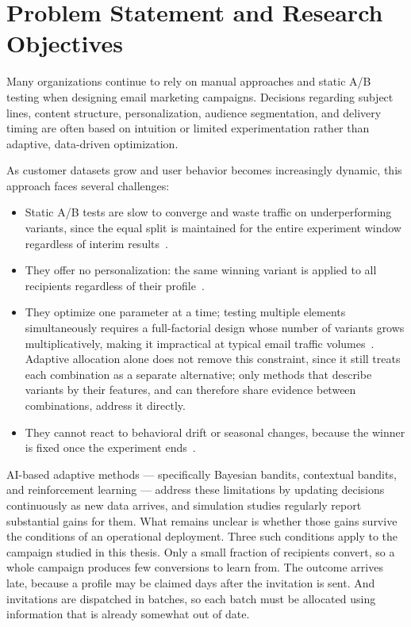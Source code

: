 \chapter{Problem Statement and Research Objectives}
\label{chap:problem_statement}

Many organizations continue to rely on manual approaches and static A/B testing when designing email marketing campaigns. Decisions regarding subject lines, content structure, personalization, audience segmentation, and delivery timing are often based on intuition or limited experimentation rather than adaptive, data-driven optimization.

As customer datasets grow and user behavior becomes increasingly dynamic, this approach faces several challenges:

\begin{itemize}
    \item Static A/B tests are slow to converge and waste traffic on underperforming variants, since the equal split is maintained for the entire experiment window regardless of interim results~\cite{schwartz2017customer, kohavi2009controlled}.
    \item They offer no personalization: the same winning variant is applied to all recipients regardless of their profile~\cite{li2010contextual}.
    \item They optimize one parameter at a time; testing multiple elements simultaneously requires a full-factorial design whose number of variants grows multiplicatively, making it impractical at typical email traffic volumes~\cite{kohavi2009controlled}. Adaptive allocation alone does not remove this constraint, since it still treats each combination as a separate alternative; only methods that describe variants by their features, and can therefore share evidence between combinations, address it directly. \item They cannot react to behavioral drift or seasonal changes, because the winner is fixed once the experiment ends~\cite{wan2023bayesian, singh2023maximize}.
\end{itemize}

AI-based adaptive methods --- specifically Bayesian bandits, contextual bandits, and reinforcement learning --- address these limitations by updating decisions continuously as new data arrives, and simulation studies regularly report substantial gains for them. What remains unclear is whether those gains survive the conditions of an operational deployment. Three such conditions apply to the campaign studied in this thesis. Only a small fraction of recipients convert, so a whole campaign produces few conversions to learn from. The outcome arrives late, because a profile may be claimed days after the invitation is sent. And invitations are dispatched in batches, so each batch must be allocated using information that is already somewhat out of date.

